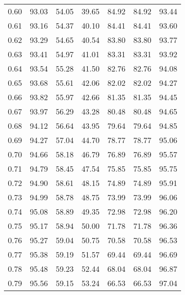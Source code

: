 \begin{tabular}{|c|c|c|c|c|c|c|}
      0.60 &     93.03 &     54.05 &      39.65 &   84.92 &      84.92 &         93.44 \\
      0.61 &     93.16 &     54.37 &      40.10 &   84.41 &      84.41 &         93.60 \\
      0.62 &     93.29 &     54.65 &      40.54 &   83.80 &      83.80 &         93.77 \\
      0.63 &     93.41 &     54.97 &      41.01 &   83.31 &      83.31 &         93.92 \\
      0.64 &     93.54 &     55.28 &      41.50 &   82.76 &      82.76 &         94.08 \\
      0.65 &     93.68 &     55.61 &      42.06 &   82.02 &      82.02 &         94.27 \\
      0.66 &     93.82 &     55.97 &      42.66 &   81.35 &      81.35 &         94.45 \\
      0.67 &     93.97 &     56.29 &      43.28 &   80.48 &      80.48 &         94.65 \\
      0.68 &     94.12 &     56.64 &      43.95 &   79.64 &      79.64 &         94.85 \\
      0.69 &     94.27 &     57.04 &      44.70 &   78.77 &      78.77 &         95.06 \\
      0.70 &     94.66 &     58.18 &      46.79 &   76.89 &      76.89 &         95.57 \\
      0.71 &     94.79 &     58.45 &      47.54 &   75.85 &      75.85 &         95.75 \\
      0.72 &     94.90 &     58.61 &      48.15 &   74.89 &      74.89 &         95.91 \\
      0.73 &     94.99 &     58.78 &      48.75 &   73.99 &      73.99 &         96.06 \\
      0.74 &     95.08 &     58.89 &      49.35 &   72.98 &      72.98 &         96.20 \\
      0.75 &     95.17 &     58.94 &      50.00 &   71.78 &      71.78 &         96.36 \\
      0.76 &     95.27 &     59.04 &      50.75 &   70.58 &      70.58 &         96.53 \\
      0.77 &     95.38 &     59.19 &      51.57 &   69.44 &      69.44 &         96.69 \\
      0.78 &     95.48 &     59.23 &      52.44 &   68.04 &      68.04 &         96.87 \\
      0.79 &     95.56 &     59.15 &      53.24 &   66.53 &      66.53 &         97.04 \\

\end{tabular}
